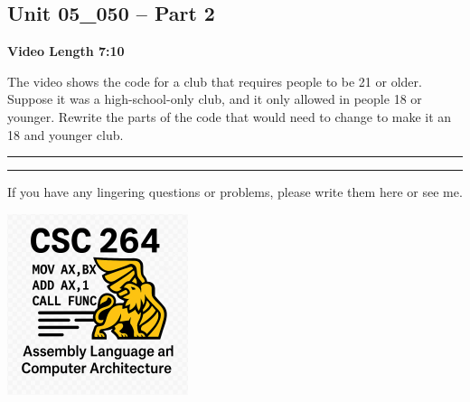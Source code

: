 \documentclass[letterpaper,12pt]{exam}
\newcommand{\unit}{Unit 05}
\begin{document}
\begin{questions}
\section*{\unit\_050 -- Part 2}
\par{\selectfont\textbf{Video Length 7:10}}
\begin{samepage}
    \question The video shows the code for a club that requires people to be 21 or older.  Suppose it was a high-school-only club, and it only allowed in people 18 or younger.  Rewrite the parts of the code that would need to change to make it an 18 and younger club.
    \vspace{35mm}
\end{samepage}
\par
\rule{0.5\textwidth}{.4pt} %





\end{questions} 
\begin{center}
    \rule{0.667\textwidth}{.8pt} %
\end{center}


If you have any lingering questions or problems, please write them here or see me.
\vfill
\begin{center}
\includegraphics{../csc264Logo}
\end{center}
\end{document}

